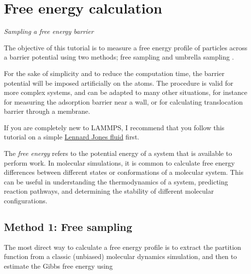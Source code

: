 \chapter{Free energy calculation}
\label{umbrella-sampling-label}

\noindent \vspace{-1cm} \noindent \textcolor{graytitle}{\textit{{\Large Sampling a free energy barrier}}\vspace{0.5cm} }

\vspace{0.25cm} \noindent The objective of this tutorial is to measure a free
energy profile of particles across a barrier potential
using two methods; free sampling
and umbrella sampling \cite{frenkel2023understanding}.

\vspace{0.25cm} \noindent For the sake of simplicity and to reduce the computation time, the
barrier potential will be imposed artificially on the atoms.
The procedure is valid for more complex
systems, and can be adapted to many other situations, for instance 
for measuring the adsorption barrier near a wall, or for calculating translocation
barrier through a membrane.

\vspace{0.25cm} \noindent If you are completely new to LAMMPS, I recommend that
you follow this tutorial on a simple \hyperref[lennard-jones-label]{Lennard Jones fluid} first.

\begin{tcolorbox}[colback=mylightblue!5!white,colframe=mylightblue!75!black,title=What is free energy]

\vspace{0.25cm} \noindent The \textit{free energy} refers to the potential energy of a system that
is available to perform work. In molecular simulations, it is
common to calculate free energy differences between different states
or conformations of a molecular system. This can be useful in understanding
the thermodynamics of a system, predicting reaction pathways, and
determining the stability of different molecular configurations.
\end{tcolorbox}

\noindent \section{Method 1: Free sampling}
The most direct way to calculate a free energy profile is to extract
the partition function from a classic (unbiased) molecular
dynamics simulation, and then to estimate the Gibbs free
energy using 

